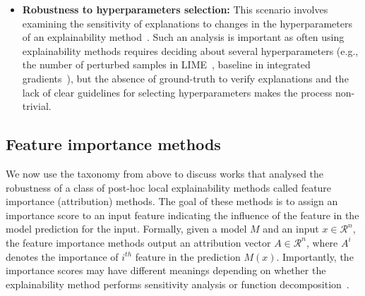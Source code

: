 \documentclass[sigconf]{acmart}
\newcommand{\s}[1]{\textcolor{red}{#1}}
\begin{document}
\begin{itemize}
    \item \textbf{Robustness to hyperparameters selection:} This scenario involves examining the sensitivity of explanations to changes in the hyperparameters of an explainability method~\cite{Zhang_arXiv_2019, Mishra_ijcnn_2020, Bansal_cvpr_2020}. Such an analysis is important as often using explainability methods requires deciding about several hyperparameters (e.g., the number of perturbed samples in LIME~\cite{Ribeiro_kdd_2016}, baseline in integrated gradients~\cite{Sundarrajan_icml_2017}), but the absence of ground-truth to verify explanations and the lack of clear guidelines for selecting hyperparameters makes the process non-trivial.

\end{itemize}

\subsection{Feature importance methods}


We now use the taxonomy from above to discuss works that analysed the robustness of a class of post-hoc local explainability methods called feature importance (attribution) methods. The goal of these methods is to assign an importance score to an input feature indicating the influence of the feature in the model prediction for the input. Formally, given a model $M$ and an input $x \in \mathcal{R}^n$, the feature importance methods output an attribution vector $A \in \mathcal{R}^n$, where $A^i$ denotes the importance of $i^{th}$ feature in the prediction $M(x)$. Importantly, the importance scores may have different meanings depending on whether the explainability method performs sensitivity analysis or function decomposition~\cite{Montavon_dsp_2018}.
\end{document}
